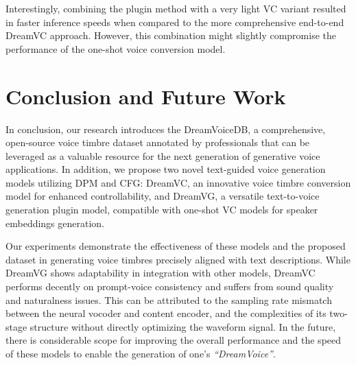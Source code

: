 \documentclass{Interspeech2024}
\begin{document}
Interestingly, combining the plugin method with a very light VC variant resulted in faster inference speeds when compared to the more comprehensive end-to-end DreamVC approach. However, this combination might slightly compromise the performance of the one-shot voice conversion model. %

\section{Conclusion and Future Work}


In conclusion, our research introduces the DreamVoiceDB, a comprehensive, open-source voice timbre dataset annotated by professionals that can be leveraged as a valuable resource for the next generation of generative voice applications. In addition, we propose two novel text-guided voice generation models utilizing DPM and CFG: DreamVC, an innovative voice timbre conversion model for enhanced controllability, and DreamVG, a versatile text-to-voice generation plugin model, compatible with one-shot VC models for speaker embeddings generation. 

Our experiments demonstrate the effectiveness of these models and the proposed dataset in generating voice timbres precisely aligned with text descriptions. While DreamVG shows adaptability in integration with other models, DreamVC performs decently on prompt-voice consistency and suffers from sound quality and naturalness issues. This can be attributed to the sampling rate mismatch between the neural vocoder and content encoder, and the complexities of its two-stage structure without directly optimizing the waveform signal. In the future, there is considerable scope for improving the overall performance and the speed of these models to enable the generation of one's \textit{``DreamVoice''}.
\end{document}
